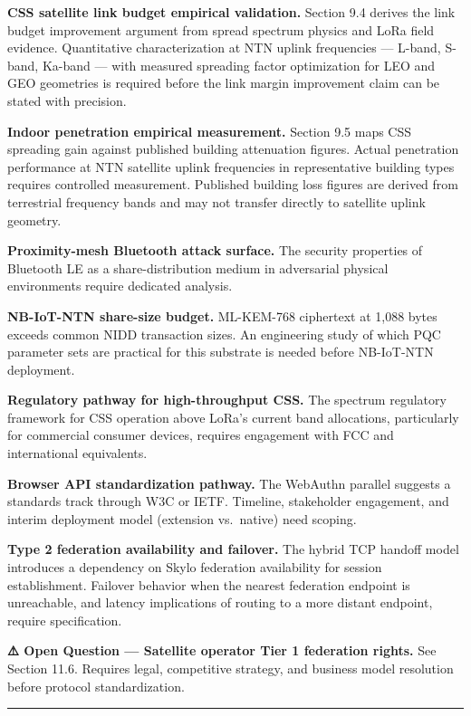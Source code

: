 \documentclass[
  11pt,
]{article}
\begin{document}
\textbf{CSS satellite link budget empirical validation.} Section 9.4
derives the link budget improvement argument from spread spectrum
physics and LoRa field evidence. Quantitative characterization at NTN
uplink frequencies --- L-band, S-band, Ka-band --- with measured
spreading factor optimization for LEO and GEO geometries is required
before the link margin improvement claim can be stated with precision.

\textbf{Indoor penetration empirical measurement.} Section 9.5 maps CSS
spreading gain against published building attenuation figures. Actual
penetration performance at NTN satellite uplink frequencies in
representative building types requires controlled measurement. Published
building loss figures are derived from terrestrial frequency bands and
may not transfer directly to satellite uplink geometry.

\textbf{Proximity-mesh Bluetooth attack surface.} The security
properties of Bluetooth LE as a share-distribution medium in adversarial
physical environments require dedicated analysis.

\textbf{NB-IoT-NTN share-size budget.} ML-KEM-768 ciphertext at 1,088
bytes exceeds common NIDD transaction sizes. An engineering study of
which PQC parameter sets are practical for this substrate is needed
before NB-IoT-NTN deployment.

\textbf{Regulatory pathway for high-throughput CSS.} The spectrum
regulatory framework for CSS operation above LoRa's current band
allocations, particularly for commercial consumer devices, requires
engagement with FCC and international equivalents.

\textbf{Browser API standardization pathway.} The WebAuthn parallel
suggests a standards track through W3C or IETF. Timeline, stakeholder
engagement, and interim deployment model (extension vs.~native) need
scoping.

\textbf{Type 2 federation availability and failover.} The hybrid TCP
handoff model introduces a dependency on Skylo federation availability
for session establishment. Failover behavior when the nearest federation
endpoint is unreachable, and latency implications of routing to a more
distant endpoint, require specification.

\textbf{⚠️ Open Question --- Satellite operator Tier 1 federation
rights.} See Section 11.6. Requires legal, competitive strategy, and
business model resolution before protocol standardization.

\begin{center}\rule{0.5\linewidth}{0.5pt}\end{center}
\end{document}
